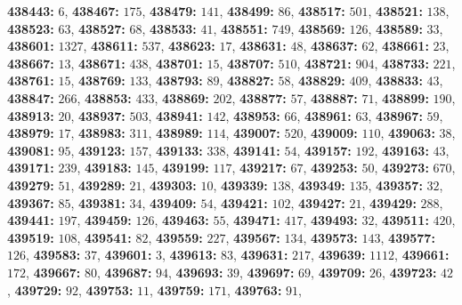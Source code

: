\textsf{\bfseries 438443:} $6$, \textsf{\bfseries 438467:} $175$, \textsf{\bfseries 438479:} $141$, \textsf{\bfseries 438499:} $86$, \textsf{\bfseries 438517:} $501$, \textsf{\bfseries 438521:} $138$, \textsf{\bfseries 438523:} $63$, \textsf{\bfseries 438527:} $68$, \textsf{\bfseries 438533:} $41$, \textsf{\bfseries 438551:} $749$, \textsf{\bfseries 438569:} $126$, \textsf{\bfseries 438589:} $33$, \textsf{\bfseries 438601:} $1327$, \textsf{\bfseries 438611:} $537$, \textsf{\bfseries 438623:} $17$, \textsf{\bfseries 438631:} $48$, \textsf{\bfseries 438637:} $62$, \textsf{\bfseries 438661:} $23$, \textsf{\bfseries 438667:} $13$, \textsf{\bfseries 438671:} $438$, \textsf{\bfseries 438701:} $15$, \textsf{\bfseries 438707:} $510$, \textsf{\bfseries 438721:} $904$, \textsf{\bfseries 438733:} $221$, \textsf{\bfseries 438761:} $15$, \textsf{\bfseries 438769:} $133$, \textsf{\bfseries 438793:} $89$, \textsf{\bfseries 438827:} $58$, \textsf{\bfseries 438829:} $409$, \textsf{\bfseries 438833:} $43$, \textsf{\bfseries 438847:} $266$, \textsf{\bfseries 438853:} $433$, \textsf{\bfseries 438869:} $202$, \textsf{\bfseries 438877:} $57$, \textsf{\bfseries 438887:} $71$, \textsf{\bfseries 438899:} $190$, \textsf{\bfseries 438913:} $20$, \textsf{\bfseries 438937:} $503$, \textsf{\bfseries 438941:} $142$, \textsf{\bfseries 438953:} $66$, \textsf{\bfseries 438961:} $63$, \textsf{\bfseries 438967:} $59$, \textsf{\bfseries 438979:} $17$, \textsf{\bfseries 438983:} $311$, \textsf{\bfseries 438989:} $114$, \textsf{\bfseries 439007:} $520$, \textsf{\bfseries 439009:} $110$, \textsf{\bfseries 439063:} $38$, \textsf{\bfseries 439081:} $95$, \textsf{\bfseries 439123:} $157$, \textsf{\bfseries 439133:} $338$, \textsf{\bfseries 439141:} $54$, \textsf{\bfseries 439157:} $192$, \textsf{\bfseries 439163:} $43$, \textsf{\bfseries 439171:} $239$, \textsf{\bfseries 439183:} $145$, \textsf{\bfseries 439199:} $117$, \textsf{\bfseries 439217:} $67$, \textsf{\bfseries 439253:} $50$, \textsf{\bfseries 439273:} $670$, \textsf{\bfseries 439279:} $51$, \textsf{\bfseries 439289:} $21$, \textsf{\bfseries 439303:} $10$, \textsf{\bfseries 439339:} $138$, \textsf{\bfseries 439349:} $135$, \textsf{\bfseries 439357:} $32$, \textsf{\bfseries 439367:} $85$, \textsf{\bfseries 439381:} $34$, \textsf{\bfseries 439409:} $54$, \textsf{\bfseries 439421:} $102$, \textsf{\bfseries 439427:} $21$, \textsf{\bfseries 439429:} $288$, \textsf{\bfseries 439441:} $197$, \textsf{\bfseries 439459:} $126$, \textsf{\bfseries 439463:} $55$, \textsf{\bfseries 439471:} $417$, \textsf{\bfseries 439493:} $32$, \textsf{\bfseries 439511:} $420$, \textsf{\bfseries 439519:} $108$, \textsf{\bfseries 439541:} $82$, \textsf{\bfseries 439559:} $227$, \textsf{\bfseries 439567:} $134$, \textsf{\bfseries 439573:} $143$, \textsf{\bfseries 439577:} $126$, \textsf{\bfseries 439583:} $37$, \textsf{\bfseries 439601:} $3$, \textsf{\bfseries 439613:} $83$, \textsf{\bfseries 439631:} $217$, \textsf{\bfseries 439639:} $1112$, \textsf{\bfseries 439661:} $172$, \textsf{\bfseries 439667:} $80$, \textsf{\bfseries 439687:} $94$, \textsf{\bfseries 439693:} $39$, \textsf{\bfseries 439697:} $69$, \textsf{\bfseries 439709:} $26$, \textsf{\bfseries 439723:} $42$, \textsf{\bfseries 439729:} $92$, \textsf{\bfseries 439753:} $11$, \textsf{\bfseries 439759:} $171$, \textsf{\bfseries 439763:} $91$, 
